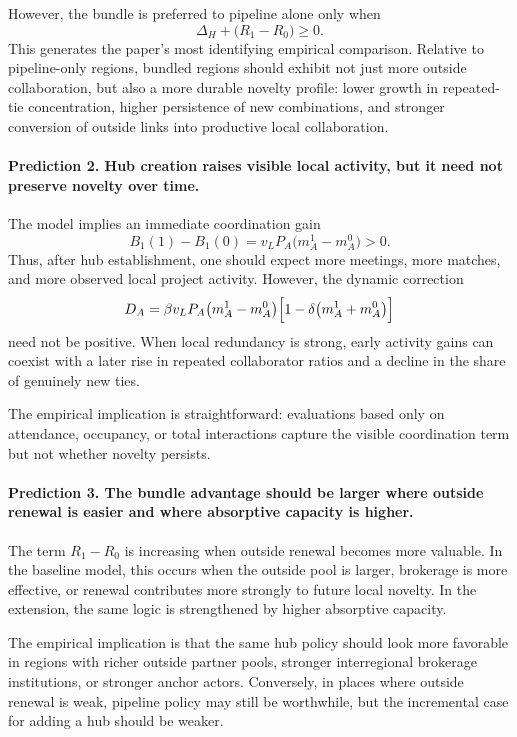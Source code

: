 However, the bundle is preferred to pipeline alone only when
\[
\Delta_H+\bigl(R_1-R_0\bigr)\ge 0.
\]
This generates the paper's most identifying empirical comparison. Relative to pipeline-only regions, bundled regions should exhibit not just more outside collaboration, but also a more durable novelty profile: lower growth in repeated-tie concentration, higher persistence of new combinations, and stronger conversion of outside links into productive local collaboration.

\paragraph{Prediction 2. Hub creation raises visible local activity, but it need not preserve novelty over time.}

The model implies an immediate coordination gain
\[
B_1(1)-B_1(0)=v_LP_A\bigl(m_A^1-m_A^0\bigr)>0.
\]
Thus, after hub establishment, one should expect more meetings, more matches, and more observed local project activity. However, the dynamic correction
\[
D_A
=
\beta v_LP_A\bigl(m_A^1-m_A^0\bigr)\Bigl[1-\delta\bigl(m_A^1+m_A^0\bigr)\Bigr]
\]
need not be positive. When local redundancy is strong, early activity gains can coexist with a later rise in repeated collaborator ratios and a decline in the share of genuinely new ties.

The empirical implication is straightforward: evaluations based only on attendance, occupancy, or total interactions capture the visible coordination term but not whether novelty persists.

\paragraph{Prediction 3. The bundle advantage should be larger where outside renewal is easier and where absorptive capacity is higher.}

The term $R_1-R_0$ is increasing when outside renewal becomes more valuable. In the baseline model, this occurs when the outside pool is larger, brokerage is more effective, or renewal contributes more strongly to future local novelty. In the extension, the same logic is strengthened by higher absorptive capacity.

The empirical implication is that the same hub policy should look more favorable in regions with richer outside partner pools, stronger interregional brokerage institutions, or stronger anchor actors. Conversely, in places where outside renewal is weak, pipeline policy may still be worthwhile, but the incremental case for adding a hub should be weaker.

